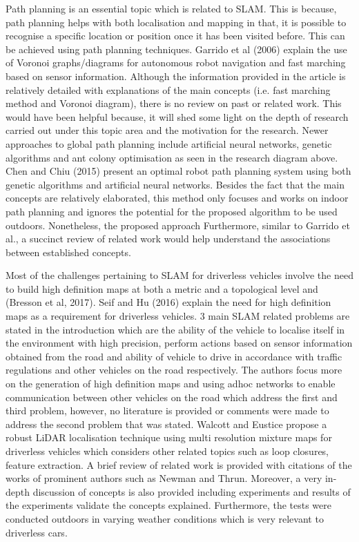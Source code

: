 \documentclass[a4paper, 12pt]{article}
\begin{document}
\newpage
Path planning is an essential topic which is related to SLAM. This is because, path planning helps with both localisation and mapping in that, it is possible to recognise a specific location or position once it has been visited before. This can be achieved using path planning techniques. Garrido et al (2006) explain the use of Voronoi graphs/diagrams for autonomous robot navigation and fast marching based on sensor information. Although the information provided in the article is relatively detailed with explanations of the main concepts (i.e. fast marching method and Voronoi diagram), there is no review on past or related work. This would have been helpful because, it will shed some light on the depth of research carried out under this topic area and the motivation for the research. Newer approaches to global path planning include artificial neural networks, genetic algorithms and ant colony optimisation as seen in the research diagram above. Chen and Chiu (2015) present an optimal robot path planning system using both genetic algorithms and artificial neural networks. Besides the fact that the main concepts are relatively elaborated, this method only focuses and works on indoor path planning and ignores the potential for the proposed algorithm to be used outdoors. Nonetheless, the proposed approach Furthermore, similar to Garrido et al., a succinct review of related work would help understand the associations between established concepts. 

Most of the challenges pertaining to SLAM for driverless vehicles involve the need to build high definition maps at both a metric and a topological level and  (Bresson et al, 2017). Seif and Hu (2016) explain the need for high definition maps as a requirement for driverless vehicles. 3 main SLAM related problems are stated in the introduction which are the ability of the vehicle to localise itself in the environment with high precision, perform actions based on sensor information obtained from the road and ability of vehicle to drive in accordance with traffic regulations and other vehicles on the road respectively. The authors focus more on the generation of high definition maps and using adhoc networks to enable communication between other vehicles on the road which address the first and third problem, however, no literature is provided or comments were made to address the second problem that was stated. Walcott and Eustice propose a robust LiDAR localisation technique using multi resolution mixture maps for driverless vehicles which considers other related topics such as loop closures, feature extraction. A brief review of related work is provided with citations of the works of prominent authors such as Newman and Thrun. Moreover, a very in-depth discussion of concepts is also provided including experiments and results of the experiments validate the concepts explained. Furthermore, the tests were conducted outdoors in varying weather conditions which is very relevant to driverless cars. 
\end{document}
